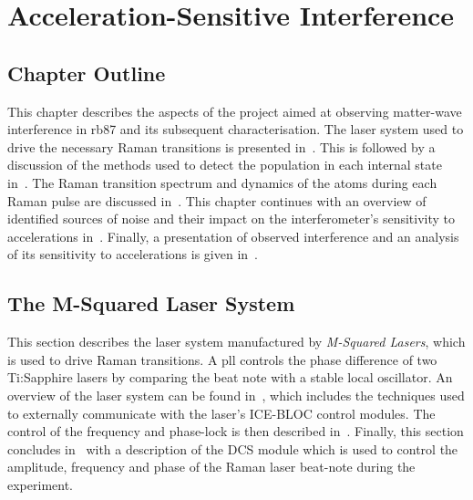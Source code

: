 \chapter{Acceleration-Sensitive Interference}\label{chap:atom_int}

\section{Chapter Outline}
This chapter describes the aspects of the project aimed at observing
matter-wave interference in \ac{rb87} and its subsequent
characterisation. The laser system used to drive the necessary Raman
transitions is presented in~. This is
followed by a discussion of the methods used to detect the population
in each internal state in~. The Raman
transition spectrum and
dynamics of the atoms during each Raman pulse are discussed
in~. This chapter continues
with an overview of identified sources of noise and their impact on
the interferometer's sensitivity to accelerations
in~. Finally, a presentation of observed
interference and an analysis of its sensitivity to accelerations is
given in~.
\section{The M-Squared Laser System}\label{sec:msquared_laser} 
  This section describes the laser system manufactured by \textit{M-Squared
  Lasers}, which is used to drive Raman transitions. 
  A \ac{pll} controls the phase difference of two Ti:Sapphire lasers
  by comparing the beat note with a stable local oscillator\nocite{Lautier2014b}\nocite{Marino2008}. An overview of the laser
  system can be found in~, which includes
  the techniques used to externally communicate with the laser's ICE-BLOC
  control modules. The control of the frequency and phase-lock is then described
  in~. Finally, this section concludes
  in~ with a description of the DCS
  module which is used to control
  the amplitude, frequency and phase of the Raman laser beat-note
  during the experiment.
